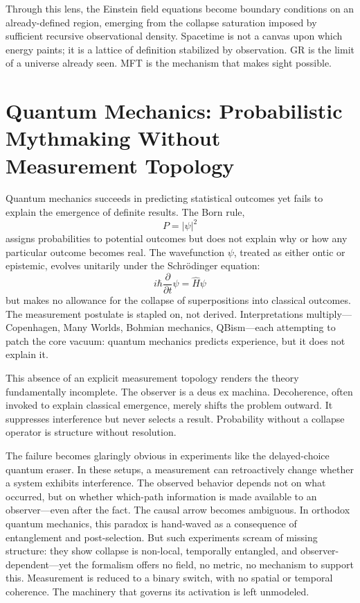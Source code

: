 Through this lens, the Einstein field equations become boundary conditions on an already-defined region, emerging from the collapse saturation imposed by sufficient recursive observational density. Spacetime is not a canvas upon which energy paints; it is a lattice of definition stabilized by observation. GR is the limit of a universe already seen. MFT is the mechanism that makes sight possible.


\section{Quantum Mechanics: Probabilistic Mythmaking Without Measurement Topology}
Quantum mechanics succeeds in predicting statistical outcomes yet fails to explain the emergence of definite results. The Born rule,
\[
P = |\psi|^2
\]
assigns probabilities to potential outcomes but does not explain why or how any particular outcome becomes real. The wavefunction \(\psi\), treated as either ontic or epistemic, evolves unitarily under the Schrödinger equation:
\[
i\hbar \frac{\partial}{\partial t}\psi = \hat{H}\psi
\]
but makes no allowance for the collapse of superpositions into classical outcomes. The measurement postulate is stapled on, not derived. Interpretations multiply—Copenhagen, Many Worlds, Bohmian mechanics, QBism—each attempting to patch the core vacuum: quantum mechanics predicts experience, but it does not explain it.

This absence of an explicit measurement topology renders the theory fundamentally incomplete. The observer is a deus ex machina. Decoherence, often invoked to explain classical emergence, merely shifts the problem outward. It suppresses interference but never selects a result. Probability without a collapse operator is structure without resolution.

The failure becomes glaringly obvious in experiments like the delayed-choice quantum eraser. In these setups, a measurement can retroactively change whether a system exhibits interference. The observed behavior depends not on what occurred, but on whether which-path information is made available to an observer—even after the fact. The causal arrow becomes ambiguous. In orthodox quantum mechanics, this paradox is hand-waved as a consequence of entanglement and post-selection. But such experiments scream of missing structure: they show collapse is non-local, temporally entangled, and observer-dependent—yet the formalism offers no field, no metric, no mechanism to support this. Measurement is reduced to a binary switch, with no spatial or temporal coherence. The machinery that governs its activation is left unmodeled.

